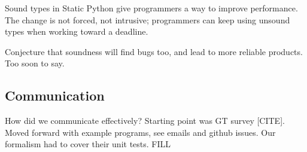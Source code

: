 \documentclass[english,cleveref,submission]{programming}
\begin{document}
Sound types in Static Python give programmers a way to improve performance.
The change is not forced, not intrusive;
programmers can keep using unsound types when working toward a deadline.

Conjecture that soundness will find bugs too, and lead to more reliable products.
Too soon to say.


\subsection{Communication}

How did we communicate effectively?
Starting point was GT survey [CITE].
Moved forward with example programs, see emails and github issues.
Our formalism had to cover their unit tests.
FILL



{\sloppy
\printbibliography
}

\end{document}
